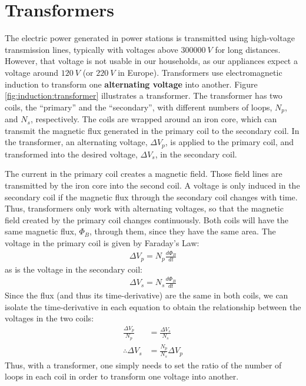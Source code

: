 \section{Transformers}
The electric power generated in power stations is transmitted using high-voltage transmission lines, typically with voltages above $\SI{300000}{V}$ for long distances. However, that voltage is not usable in our households, as our appliances expect a voltage around $\SI{120}{V}$ (or $\SI{220}{V}$ in Europe). Transformers use electromagnetic induction to transform one \textbf{alternating voltage} into another. Figure \ref{fig:induction:transformer} illustrates a transformer.
The transformer has two coils, the ``primary'' and the ``secondary'', with different numbers of loops, $N_p$, and $N_s$, respectively. The coils are wrapped around an iron core, which can transmit the magnetic flux generated in the primary coil to the secondary coil. In the transformer, an alternating voltage, $\Delta V_p$, is applied to the primary coil, and transformed into the desired voltage, $\Delta V_s$, in the secondary coil. 

The current in the primary coil creates a magnetic field. Those field lines are transmitted by the iron core into the second coil. A voltage is only induced in the secondary coil if the magnetic flux through the secondary coil changes with time. Thus, transformers only work with alternating voltages, so that the magnetic field created by the primary coil changes continuously. Both coils will have the same magnetic flux, $\Phi_B$, through them, since they have the same area. The voltage in the primary coil is given by Faraday's Law:
\begin{align*}
\Delta V_p = N_p \frac{d\Phi_B}{dt}
\end{align*}
as is the voltage in the secondary coil:
\begin{align*}
\Delta V_s = N_s \frac{d\Phi_B}{dt}
\end{align*}
Since the flux (and thus its time-derivative) are the same in both coils, we can isolate the time-derivative in each equation to obtain the relationship between the voltages in the two coils:
\begin{align*}
\frac{\Delta V_p}{N_p}&=\frac{\Delta V_s}{N_s}\\
\therefore \Delta V_s &= \frac{N_p}{N_s}\Delta V_p
\end{align*}
Thus, with a transformer, one simply needs to set the ratio of the number of loops in each coil in order to transform one voltage into another.

